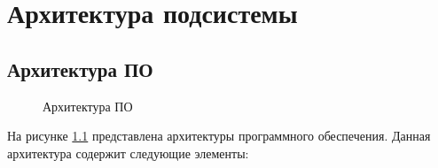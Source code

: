 \chapter{Архитектура подсистемы}

\section{Архитектура ПО}

\begin{figure}[H]
    \caption{Архитектура ПО}
    \label{ris:arh1}
\end{figure}

На рисунке \ref{ris:arh1} представлена архитектуры программного обеспечения. Данная архитектура содержит следующие элементы:

